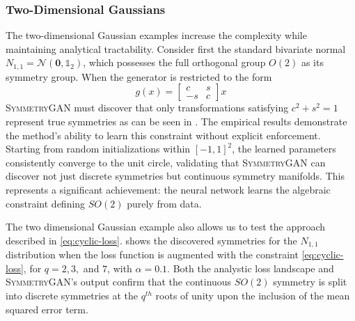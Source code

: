             \subsubsection{Two-Dimensional Gaussians}
                The two-dimensional Gaussian examples increase the complexity while maintaining analytical tractability.
                Consider first the standard bivariate normal \(N_{1, 1} = \mathcal{N}(\mathbf{0}, \mathbb{1}_2)\), which possesses the full orthogonal group \(O(2)\) as its symmetry group.
                When the generator is restricted to the form
                \[
                    \label{eq:SO2_generator}
                    g(x) = \begin{bmatrix} c & s \\ -s & c \end{bmatrix} x
                \]
                \textsc{SymmetryGAN} must discover that only transformations satisfying \(c^2 + s^2 = 1\) represent true symmetries as can be seen in .
                The empirical results demonstrate the method's ability to learn this constraint without explicit enforcement.
                Starting from random initializations within \([-1, 1]^2\), the learned parameters consistently converge to the unit circle, validating that \textsc{SymmetryGAN} can discover not just discrete symmetries but continuous symmetry manifolds.
                This represents a significant achievement: the neural network learns the algebraic constraint defining \(SO(2)\) purely from data.

                The two dimensional Gaussian example also allows us to test the approach described in \cref{eq:cyclic-loss}.
                 shows the discovered symmetries for the \(N_{1, 1}\) distribution when the loss function is augmented with the constraint \cref{eq:cyclic-loss}, for \(q = 2, 3,\) and \(7\), with \(\alpha = 0.1\).
                Both the analystic loss landscape and \textsc{SymmetryGAN}'s output confirm that the continuous \(SO(2)\) symmetry is split into discrete symmetries at the \(q^{th}\) roots of unity upon the inclusion of the mean squared error term.

